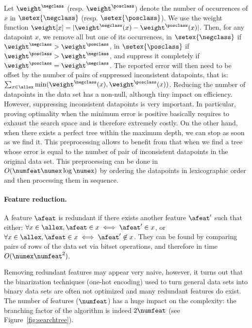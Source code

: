 \documentclass{article}
\begin{document}
Let $\weight^{\negclass}$ (resp. $\weight^{\posclass}$) denote the number of occurrences of $x$ in $\setex{\negclass}$ (resp. $\setex{\posclass}$). We use the weight function $\weight[x] = |\weight^{\negclass}(x) - \weight^{\posclass}(x)|$. Then, for any datapoint $x$, we remove all but one of its occurrences, in $\setex{\negclass}$ if $\weight^{\negclass}>\weight^{\posclass}$, in $\setex{\posclass}$ if $\weight^{\posclass}>\weight^{\negclass}$, and suppress it completely if $\weight^{\posclass}=\weight^{\negclass}$.
The reported error will then need to be offset by the number of pairs of suppressed inconsistent datapoints, that is:
$
\sum_{x \in \allex}\min(\weight^{\negclass}(x), \weight^{\posclass}(x))
$.
Reducing the number of datapoints in the data set has a non-null, although tiny impact on efficiency. However, suppressing inconsistent datapoints is very important. In particular, proving optimality when the minimum error is positive basically requires to exhaust the search space and is therefore extremely costly. On the other hand, when there exists a perfect tree within the maximum depth, we can stop as soon as we find it. This preprocessing allows to benefit from that when we find a tree whose error is equal to the number of pair of inconsistent datapoints in the original data set.
This preprocessing can be done in $O(\numfeat \numex \log \numex)$ by ordering the datapoints in lexicographic order and then processing them in sequence.

\paragraph{Feature reduction.}

A feature $\afeat$ is redundant if there exists another feature $\afeat'$ such that either: $\forall x \in \allex, \afeat \in x \iff \afeat' \in x$, or $\forall x \in \allex, \afeat \in x \iff \afeat' \not\in x$. 
They can be found by comparing pairs of rows of the data set via bitset operations, and therefore in time $O(\numex\numfeat^2)$.

Removing redundant features may appear very naive, however, it turns out that the binarization techniques (one-hot encoding) used to turn general data sets into binary data sets are often not optimized and many redundant features do exist. The number of features ($\numfeat$) has a huge impact on the complexity:
 the branching factor of the algorithm is indeed
 $2\numfeat$ (see Figure~\ref{fig:searchtree}).
\end{document}
